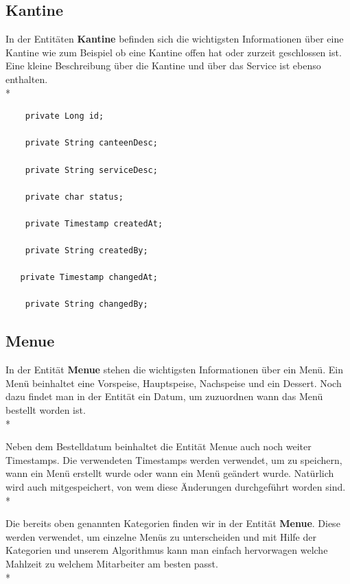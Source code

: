 \pagebreak

\subsection{Kantine}

In der Entitäten \textbf{Kantine} befinden sich die wichtigsten Informationen über eine Kantine wie zum Beispiel ob eine Kantine offen hat oder zurzeit geschlossen ist. 
Eine kleine Beschreibung über die Kantine und über das Service ist ebenso enthalten. \\*

\begin{lstlisting}
    private Long id;

    private String canteenDesc;

    private String serviceDesc;

    private char status;

    private Timestamp createdAt;

    private String createdBy;

   private Timestamp changedAt;

    private String changedBy;

\end{lstlisting}

\subsection{Menue}

In der Entität \textbf{Menue} stehen die wichtigsten Informationen über ein Menü. Ein Menü beinhaltet eine Vorspeise, Hauptspeise, Nachspeise und ein Dessert. 
Noch dazu findet man in der Entität ein Datum, um zuzuordnen wann das Menü bestellt worden ist. \\*

Neben dem Bestelldatum beinhaltet die Entität Menue auch noch weiter Timestamps.
Die verwendeten Timestamps werden verwendet, um zu speichern, wann ein Menü erstellt wurde oder wann ein Menü geändert wurde. 
Natürlich wird auch mitgespeichert, von wem diese Änderungen durchgeführt worden sind. \\*

\pagebreak

Die bereits oben genannten Kategorien finden wir in der Entität \textbf{Menue}. 
Diese werden verwendet, um einzelne Menüs zu unterscheiden und mit Hilfe der Kategorien und unserem Algorithmus kann man einfach hervorwagen welche Mahlzeit zu welchem Mitarbeiter am besten passt. \\*

